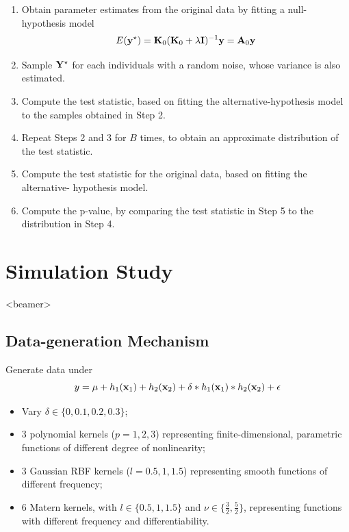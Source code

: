 \documentclass{beamer}
\begin{document}
\begin{frame}
\begin{enumerate}[<+->]
\item Obtain parameter estimates from the original data by fitting a null-hypothesis model $$E({\bf y}^\star)={\bf K}_0({\bf K}_0+\lambda {\bf I})^{-1}{\bf y}={\bf A}_0{\bf y}$$
\item Sample ${\bf Y}^\star$ for each individuals with a random noise, whose variance is also estimated.
\item Compute the test statistic, based on fitting the alternative-hypothesis model to the samples obtained in Step 2.
\item Repeat Steps 2 and 3 for $B$ times, to obtain an approximate distribution of the test statistic.
\item Compute the test statistic for the original data, based on fitting the alternative- hypothesis model.
\item Compute the p-value, by comparing the test statistic in Step 5 to the distribution in Step 4.
\end{enumerate}
\end{frame}


\section{Simulation Study}

\begin{frame}<beamer>
\tableofcontents[currentsection]
\end{frame}

\subsection{Data-generation Mechanism}
\begin{frame}
Generate data under
$$y=\mu+h_1({\bf x}_1)+h_2({\bf x}_2)+\delta * h_1({\bf x}_1) * h_2({\bf x}_2)+\epsilon$$
\begin{itemize}
\item Vary $\delta \in \{0, 0.1, 0.2, 0.3\}$;
\item 3 polynomial kernels ($p=1, 2, 3$) representing finite-dimensional, parametric functions of different degree of nonlinearity;
\item 3 Gaussian RBF kernels ($l=0.5, 1, 1.5$) representing smooth functions of different frequency;
\item 6 Matern kernels, with $l \in \{0.5, 1, 1.5\}$ and $\nu \in \{\frac{3}{2}, \frac{5}{2}\}$, representing functions with different frequency and differentiability.
\end{itemize}
\end{frame}
\end{document}
